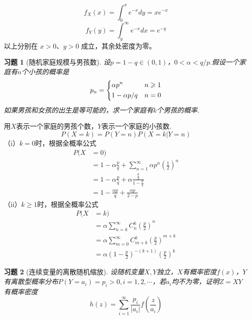 \documentclass[UTF8,12pt,a4paper,fontset=fandol]{ctexart}
\newtheorem{exercise}{习题}[section]
\begin{document}
\begin{solve}\label{a:Y4.15}
\[{f_X}(x) = \int_0^x {{e^{ - x}}dy}  = x{e^{ - x}}\]
    \[{f_Y}(y) = \int_y^\infty  {{e^{ - x}}dx}  = {e^{ - y}}\]
 以上分别在 $x>0$、$y>0$ 成立，其余处密度为零。\end{solve}

\begin{exercise}[随机家庭规模与男孩数]\label{q:Y4.16}
设$p=1-q\in (0,1)$，$0<\alpha<q/p$.假设一个家庭有$n$个小孩的概率是
\[{p_n} = \left\{ \begin{gathered}
  \alpha {p^n} \hfill \quad n\geqslant 1\\
  1 - \alpha p/q \hfill \quad n=0\\ 
\end{gathered}  \right.\]
如果男孩和女孩的出生是等可能的，求一个家庭有$k$个男孩的概率.\par{}
\end{exercise}

\begin{solve}\label{a:Y4.16}
用$X$表示一个家庭的男孩个数，$Y$表示一个家庭的小孩数.    
\[P(X = k) = P(Y = n)P(X = k|Y = n)\]
    （i）$k=0$时，根据全概率公式
    \[\begin{aligned}P(X &= 0) \\&= 1 - \alpha \frac{p}{q} + {\sum\limits_{n = 1}^\infty  {\alpha {p^n}\left( {\frac{1}{2}} \right)} ^n} \\&= 1 - \alpha \frac{p}{q} + \alpha \frac{{\frac{p}{2}}}{{1 - \frac{p}{2}}} \\&= 1 - \frac{{\alpha p}}{q} + \frac{{\alpha p}}{{2 - p}}\end{aligned}\]
    （ii）$k\geqslant 1$时，根据全概率公式
    \[\begin{aligned}P(X &= k) \\&= \alpha {\sum\limits_{n = k}^\infty  {C_n^k\left( {\frac{p}{2}} \right)} ^n} \\&= \alpha {\sum\limits_{m = 0}^\infty  {C_{m + k}^k\left( {\frac{p}{2}} \right)} ^{m + k}} \\&= \alpha {\left( {1 - \frac{p}{2}} \right)^{ - (k + 1)}}{\left( {\frac{p}{2}} \right)^k}\end{aligned}\]
\end{solve}

\begin{exercise}[连续变量的离散随机缩放]\label{q:Y4.22}
设随机变量$X,Y$独立，$X$有概率密度$f(x)$，$Y$有离散型概率分布$P(Y=a_i)=p_i>0,i=1,2,\cdots$，若$a_i$均不为零，证明$Z=XY$有概率密度
\[h(z) = \sum\limits_{i = 1}^\infty  {\frac{{{p_i}}}{{|{a_i}|}}f\left( {\frac{z}{{{a_i}}}} \right)} \]\par{}
\end{exercise}
\end{document}
